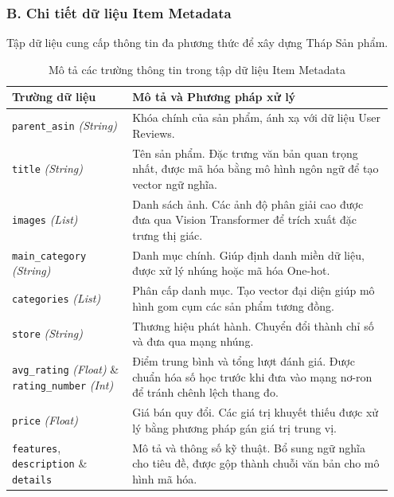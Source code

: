 \subsubsection*{B. Chi tiết dữ liệu Item Metadata}
Tập dữ liệu cung cấp thông tin đa phương thức để xây dựng Tháp Sản phẩm.

\begin{table}[H]
    \centering
    \caption{Mô tả các trường thông tin trong tập dữ liệu Item Metadata}
    \label{tab:item_metadata_desc}
    \renewcommand{\arraystretch}{1.3}
    \begin{tabular}{|p{0.3\linewidth}|p{0.65\linewidth}|}
        \hline
        \textbf{Trường dữ liệu} & \textbf{Mô tả và Phương pháp xử lý} \\
        \hline
        \texttt{parent\_asin} \newline \textit{(String)} & 
        Khóa chính của sản phẩm, ánh xạ với dữ liệu User Reviews. \\
        \hline
        \texttt{title} \newline \textit{(String)} & 
        Tên sản phẩm. Đặc trưng văn bản quan trọng nhất, được mã hóa bằng mô hình ngôn ngữ để tạo vector ngữ nghĩa. \\
        \hline
        \texttt{images} \newline \textit{(List)} & 
        Danh sách ảnh. Các ảnh độ phân giải cao được đưa qua Vision Transformer để trích xuất đặc trưng thị giác. \\
        \hline
        \texttt{main\_category} \newline \textit{(String)} & 
        Danh mục chính. Giúp định danh miền dữ liệu, được xử lý nhúng hoặc mã hóa One-hot. \\
        \hline
        \texttt{categories} \newline \textit{(List)} & 
        Phân cấp danh mục. Tạo vector đại diện giúp mô hình gom cụm các sản phẩm tương đồng. \\
        \hline
        \texttt{store} \newline \textit{(String)} & 
        Thương hiệu phát hành. Chuyển đổi thành chỉ số và đưa qua mạng nhúng. \\
        \hline
        \texttt{avg\_rating} \textit{(Float)} \& \newline \texttt{rating\_number} \textit{(Int)} & 
        Điểm trung bình và tổng lượt đánh giá. Được chuẩn hóa số học trước khi đưa vào mạng nơ-ron để tránh chênh lệch thang đo. \\
        \hline
        \texttt{price} \newline \textit{(Float)} & 
        Giá bán quy đổi. Các giá trị khuyết thiếu được xử lý bằng phương pháp gán giá trị trung vị. \\
        \hline
        \texttt{features}, \texttt{description} \newline \& \texttt{details} & 
        Mô tả và thông số kỹ thuật. Bổ sung ngữ nghĩa cho tiêu đề, được gộp thành chuỗi văn bản cho mô hình mã hóa. \\
        \hline
    \end{tabular}
\end{table}

